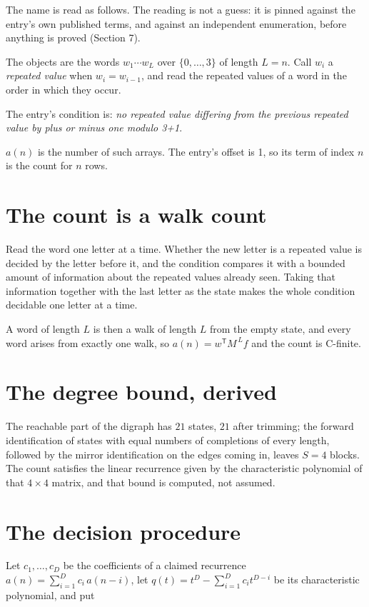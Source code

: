 \documentclass[11pt]{article}
\theoremstyle{definition}
\begin{document}
The name is read as follows. The reading is not a guess: it is pinned against the entry's own published terms, and against an independent enumeration, before anything is proved (Section 7).

The objects are the words $w_1\cdots w_L$ over $\{0,\dots,3\}$ of length $L = n$. Call $w_i$ a {\itshape repeated value} when $w_i = w_{i-1}$, and read the repeated values of a word in the order in which they occur.

The entry's condition is: {\itshape no repeated value differing from the previous repeated value by plus or minus one modulo 3+1}.

$a(n)$ is the number of such arrays. The entry's offset is 1, so its term of index $n$ is the count for $n$ rows.

\section{The count is a walk count}

Read the word one letter at a time. Whether the new letter is a repeated value is decided by the letter before it, and the condition compares it with a bounded amount of information about the repeated values already seen. Taking that information together with the last letter as the state makes the whole condition decidable one letter at a time.

A word of length $L$ is then a walk of length $L$ from the empty state, and every word arises from exactly one walk, so $a(n) = w^{\mathsf T}M^{\,L}f$ and the count is C-finite.

\section{The degree bound, derived}

The reachable part of the digraph has $21$ states, $21$ after trimming; the forward identification of states with equal numbers of completions of every length, followed by the mirror identification on the edges coming in, leaves $S = 4$ blocks. The count satisfies the linear recurrence given by the characteristic polynomial of that $4\times4$ matrix, and that bound is computed, not assumed.

\section{The decision procedure}

Let $c_1,\dots,c_D$ be the coefficients of a claimed recurrence $a(n) = \sum_{i=1}^{D} c_i\,a(n-i)$, let $q(t) = t^{D} - \sum_{i=1}^{D} c_i t^{D-i}$ be its characteristic polynomial, and put
\end{document}
